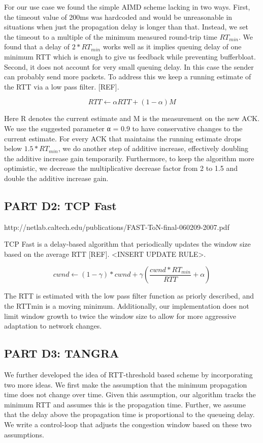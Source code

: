 \documentclass[12pt]{article}
\begin{document}
For our use case we found the simple AIMD scheme lacking in two ways. First, the
timeout value of 200ms was hardcoded and would be unreasonable in situations
when just the propagation delay is longer than that. Instead, we set the timeout
to a multiple of the minimum measured round-trip time $RT_{min}$. We found that
a delay of $2*RT_{min}$ works well as it implies queuing delay of one minimum
RTT which is enough to give us feedback while preventing bufferbloat. Second, it
does not account for very small queuing delay. In this case the sender can
probably send more packets. To address this we keep a running estimate of the
RTT via a low pass filter. [REF]. 

$${RTT} \leftarrow \alpha {RTT} + \left(1 - \alpha\right)M$$

Here R denotes the current estimate and M is the measurement on the new ACK. We
use the suggested parameter α = 0.9 to have conservative changes to the current
estimate. For every ACK that maintains the running estimate drops below
$1.5*RT_{min}$, we do another step of additive increase, effectively doubling
the additive increase gain temporarily. Furthermore, to keep the algorithm more
optimistic, we decrease the multiplicative decrease factor from 2 to 1.5 and
double the additive increase gain.

\subsection*{PART D2: TCP Fast}

http://netlab.caltech.edu/publications/FAST-ToN-final-060209-2007.pdf

TCP Fast is a delay-based algorithm that periodically updates the window size
based on the average RTT [REF]. <INSERT UPDATE RULE>.

$$cwnd \leftarrow (1 - \gamma)* cwnd + \gamma \left(\frac{cwnd * {RT_{min}}}{RTT} + \alpha \right)$$

The RTT is estimated with the low pass filter function as priorly described, and
the RTTmin is a moving minimum. Additionally, our implementation does not limit
window growth to twice the window size to allow for more aggressive adaptation
to network changes. 

\subsection*{PART D3: TANGRA}

We further developed the idea of RTT-threshold based scheme by incorporating two
more ideas. We first make the assumption that the minimum propagation time does
not change over time. Given this assumption, our algorithm tracks the minimum
RTT and assumes this is the propagation time. Further, we assume that the delay
above the propagation time is proportional to the queueing delay. We write a
control-loop that adjusts the congestion window based on these two assumptions.
\end{document}
